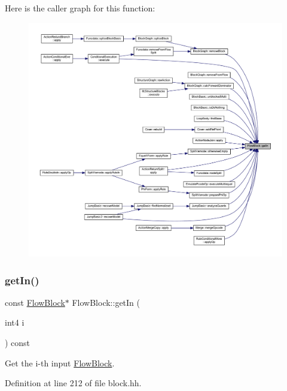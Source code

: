 Here is the caller graph for this function\+:
\nopagebreak
\begin{figure}[H]
\begin{center}
\leavevmode
\includegraphics[width=350pt]{class_flow_block_acbb1f895710c8339bd21d9c7a3200322_icgraph}
\end{center}
\end{figure}
\mbox{\label{class_flow_block_acb3aa734493ac5920c0c76f7069a67b7}} 
\subsubsection{\texorpdfstring{getIn()}{getIn()}\hspace{0.1cm}{\footnotesize\ttfamily [2/2]}}
{\footnotesize\ttfamily const \mbox{\hyperlink{class_flow_block}{Flow\+Block}}$\ast$ Flow\+Block\+::get\+In (\begin{DoxyParamCaption}\item[{int4}]{i }\end{DoxyParamCaption}) const\hspace{0.3cm}{\ttfamily [inline]}}



Get the i-\/th input \mbox{\hyperlink{class_flow_block}{Flow\+Block}}. 



Definition at line 212 of file block.\+hh.

